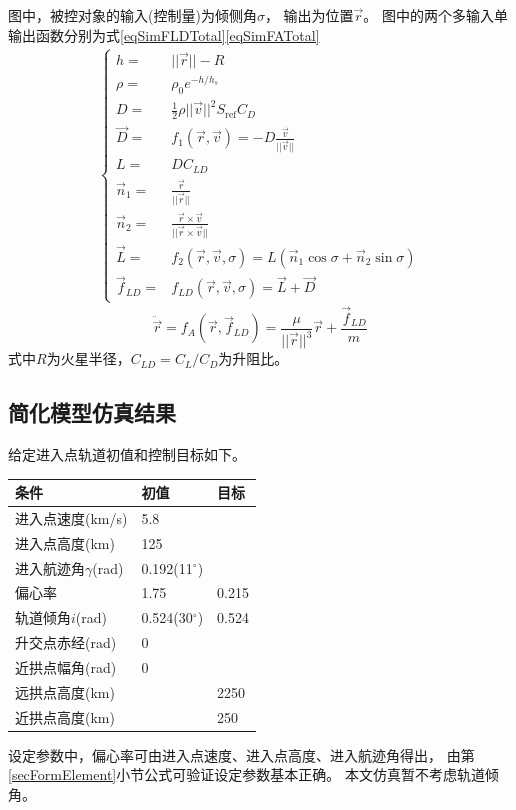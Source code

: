 图中，被控对象的输入(控制量)为倾侧角$\sigma$，
输出为位置$\vec{r}$。
图中的两个多输入单输出函数分别为式\eqref{eqSimFLDTotal}\eqref{eqSimFATotal}
\begin{align}
    \left\{\begin{aligned}
    h =& ||\vec{r}||-R \\
    \rho =& \rho_0e^{-h/h_s} \\
    D =& \frac{1}{2}\rho||\vec{v}||^2S_{\text{ref}}C_D \\
    \vec{D} =& f_1(\vec{r},\vec{v}) = -D\frac{\vec{v}}{||\vec{v}||} \\
    L =& DC_{LD} \\
    \vec{n}_1 =& \frac{\vec{r}}{||\vec{r}||} \\
    \vec{n}_2 =& \frac{\vec{r}\times\vec{v}}{||\vec{r}\times\vec{v}||} \\
    \vec{L} =& f_2(\vec{r},\vec{v},\sigma) = L(\vec{n}_1\cos\sigma + \vec{n}_2\sin\sigma) \\
    \vec{f}_{LD} =& f_{LD}(\vec{r},\vec{v},\sigma) = \vec{L} + \vec{D}
\end{aligned}\right. \label{eqSimFLDTotal}
\end{align}
\begin{equation}
    \ddot{\vec{r}} = f_A(\vec{r},\vec{f}_{LD}) = \frac{\mu}{||\vec{r}||^3}\vec{r}+\frac{\vec{f}_{LD}}{m} \label{eqSimFATotal}
\end{equation}
式中$R$为火星半径，$C_{LD}=C_L/C_D$为升阻比。

\subsection{简化模型仿真结果}
给定进入点轨道初值和控制目标如下。
\begin{center}\begin{tabular}{lll}
    \toprule
    条件 & 初值 & 目标 \\
    \midrule
    进入点速度(km/s) & 5.8 \\
    进入点高度(km) & 125 \\
    进入航迹角$\gamma$(rad) & 0.192(11$^\circ$) \\
    偏心率 & 1.75 & 0.215 \\
    轨道倾角$i$(rad) & 0.524(30$^\circ$) & 0.524 \\
    升交点赤经(rad) & 0 & \\
    近拱点幅角(rad) & 0 & \\
    远拱点高度(km) & & 2250 \\
    近拱点高度(km) & & 250 \\
    \bottomrule
\end{tabular}\end{center}
设定参数中，偏心率可由进入点速度、进入点高度、进入航迹角得出，
由第\ref{secFormElement}小节公式可验证设定参数基本正确。
本文仿真暂不考虑轨道倾角。

